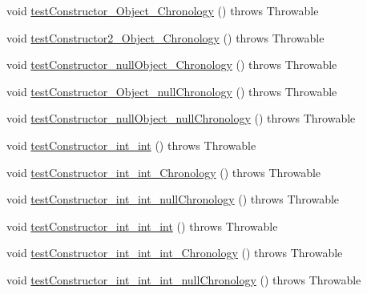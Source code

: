 \begin{DoxyCompactItemize}
\item 
void \hyperlink{classorg_1_1joda_1_1time_1_1_test_time_of_day___constructors_a28579b06170906237f472991a11d7733}{test\-Constructor\-\_\-\-Object\-\_\-\-Chronology} ()  throws Throwable 
\item 
void \hyperlink{classorg_1_1joda_1_1time_1_1_test_time_of_day___constructors_a51a71dceba0ceebad4771a4d29c60b51}{test\-Constructor2\-\_\-\-Object\-\_\-\-Chronology} ()  throws Throwable 
\item 
void \hyperlink{classorg_1_1joda_1_1time_1_1_test_time_of_day___constructors_a809d08de8d4e83e4a69d0e7aa899bd36}{test\-Constructor\-\_\-null\-Object\-\_\-\-Chronology} ()  throws Throwable 
\item 
void \hyperlink{classorg_1_1joda_1_1time_1_1_test_time_of_day___constructors_a5dfd49c0e9b7fded12ffb82b777b03e1}{test\-Constructor\-\_\-\-Object\-\_\-null\-Chronology} ()  throws Throwable 
\item 
void \hyperlink{classorg_1_1joda_1_1time_1_1_test_time_of_day___constructors_a39a8c12107a387b1dabfbfb3156207ef}{test\-Constructor\-\_\-null\-Object\-\_\-null\-Chronology} ()  throws Throwable 
\item 
void \hyperlink{classorg_1_1joda_1_1time_1_1_test_time_of_day___constructors_adae0cb67017211fd8e33915ed7824546}{test\-Constructor\-\_\-int\-\_\-int} ()  throws Throwable 
\item 
void \hyperlink{classorg_1_1joda_1_1time_1_1_test_time_of_day___constructors_a590a46912c3a25d1aa51f9c1f679b9db}{test\-Constructor\-\_\-int\-\_\-int\-\_\-\-Chronology} ()  throws Throwable 
\item 
void \hyperlink{classorg_1_1joda_1_1time_1_1_test_time_of_day___constructors_af55c95f962429759b5be5714a9c2e477}{test\-Constructor\-\_\-int\-\_\-int\-\_\-null\-Chronology} ()  throws Throwable 
\item 
void \hyperlink{classorg_1_1joda_1_1time_1_1_test_time_of_day___constructors_a4cbf4f7903c35ed71ea3b28ee7e41cab}{test\-Constructor\-\_\-int\-\_\-int\-\_\-int} ()  throws Throwable 
\item 
void \hyperlink{classorg_1_1joda_1_1time_1_1_test_time_of_day___constructors_acaca0cbb3475ab90ad75a218e52f7a1d}{test\-Constructor\-\_\-int\-\_\-int\-\_\-int\-\_\-\-Chronology} ()  throws Throwable 
\item 
void \hyperlink{classorg_1_1joda_1_1time_1_1_test_time_of_day___constructors_a5adfbc0a225e51372f2aa2e9c48cc406}{test\-Constructor\-\_\-int\-\_\-int\-\_\-int\-\_\-null\-Chronology} ()  throws Throwable 
\item 

\end{DoxyCompactItemize}
